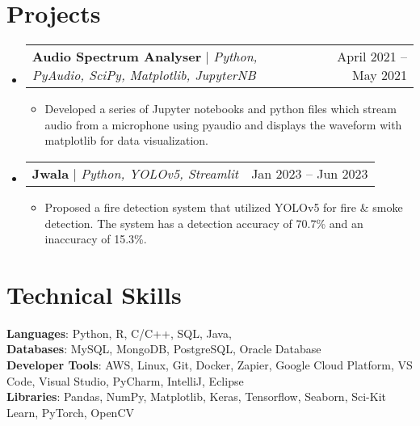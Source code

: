 \documentclass[letterpaper,11pt]{article}
\makeatletter
\newcommand{\resumeItem}[1]{
  \item\small{
    {#1 \vspace{-2pt}}
  }
}
\newcommand{\resumeProjectHeading}[2]{
    \item
    \begin{tabular*}{0.97\textwidth}{l@{\extracolsep{\fill}}r}
      \small#1 & #2 \\
    \end{tabular*}\vspace{-7pt}
}
\newcommand{\resumeSubHeadingListStart}{\begin{itemize}[leftmargin=0.15in, label={}]}
\newcommand{\resumeSubHeadingListEnd}{\end{itemize}}
\newcommand{\resumeItemListStart}{\begin{itemize}}
\newcommand{\resumeItemListEnd}{\end{itemize}\vspace{-5pt}}
\makeatother
\begin{document}
\section{Projects}
    \resumeSubHeadingListStart
      \resumeProjectHeading
          {\textbf{Audio Spectrum Analyser} $|$ \emph{Python, PyAudio, SciPy, Matplotlib, JupyterNB}}{April 2021 -- May 2021}
          \resumeItemListStart
            \resumeItem{Developed a series of Jupyter notebooks and python files which stream audio from a microphone using pyaudio and displays the waveform with matplotlib for data visualization.}
          \resumeItemListEnd
      \resumeProjectHeading
          {\textbf{Jwala} $|$ \emph{Python, YOLOv5, Streamlit}}{Jan 2023 -- Jun 2023}
          \resumeItemListStart
            \resumeItem{Proposed a fire detection system that utilized YOLOv5 for fire \& smoke detection. The system has a detection accuracy of 70.7\% and an inaccuracy of 15.3\%. }
          \resumeItemListEnd
    \resumeSubHeadingListEnd



%
\section{Technical Skills}
 \begin{itemize}[leftmargin=0.15in, label={}]
    \small{\item{
     \textbf{Languages}{: Python, R, C/C++, SQL, Java, } \\
     \textbf{Databases}{: MySQL, MongoDB, PostgreSQL, Oracle Database} \\
     \textbf{Developer Tools}{: AWS, Linux, Git, Docker, Zapier, Google Cloud Platform, VS Code, Visual Studio, PyCharm, IntelliJ, Eclipse} \\
     \textbf{Libraries}{: Pandas, NumPy, Matplotlib, Keras, Tensorflow, Seaborn, Sci-Kit Learn, PyTorch, OpenCV }
    }}
 \end{itemize}


\end{document}
